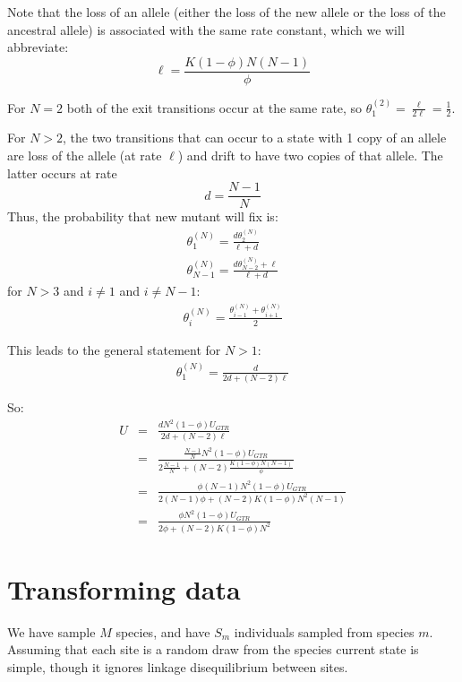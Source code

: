 \documentclass{llncs}
\newcommand{\polyProb}{\ensuremath{\phi}}
\newcommand{\Knorm}{\ensuremath{K}}
\begin{document}
Note that the loss of an allele (either the loss of the new allele or the 
    loss of the ancestral allele) is associated with the same rate constant, which we will
    abbreviate:
    $$\ell = \frac{\Knorm (1-\polyProb)N(N-1)}{\polyProb }$$

For $N=2$ both of the exit transitions occur at the same rate, so $\theta_1^{(2)} = \frac{\ell}{2\ell} = \frac{1}{2}$.

For $N > 2$, the two transitions that can occur to a state with 1 copy of an allele are 
    loss of the allele (at rate $\ell$) and drift to have two copies of that allele.
The latter occurs at rate $$d = \frac{N-1}{N}$$
Thus, the probability that new mutant will fix is:
\begin{eqnarray}
    \theta_1^{(N)} = \frac{d\theta_2^{(N)}}{\ell + d} \\
    \theta_{N-1}^{(N)} = \frac{d\theta_{N-2}^{(N)} + \ell}{\ell + d}
\end{eqnarray}
for $N > 3$ and $i \neq 1$ and $i \neq N-1$:
\begin{eqnarray}
    \theta_{i}^{(N)} = \frac{\theta_{i-1}^{(N)} + \theta_{i+1}^{(N)}}{2}
\end{eqnarray}

This leads to the general statement for $N > 1$:
\begin{eqnarray}
    \theta_1^{(N)} = \frac{d}{2d + (N-2)\ell}
\end{eqnarray}

So:
\begin{eqnarray}
 U & = &  \frac{dN^2(1-\polyProb)U_{GTR}}{2d + (N-2)\ell} \\
  & = &  \frac{\frac{N-1}{N}N^2(1-\polyProb)U_{GTR}}{2\frac{N-1}N
                                                     + (N-2)\frac{\Knorm (1-\polyProb)N(N-1)}{\polyProb }} \\
  & = &  \frac{\polyProb(N-1)N^2(1-\polyProb)U_{GTR}}{2(N-1)\polyProb
                                                     + (N-2)\Knorm (1-\polyProb)N^2(N-1)} \\
  & = &  \frac{\polyProb N^2(1-\polyProb)U_{GTR}}{2\polyProb
                                                     + (N-2)\Knorm (1-\polyProb)N^2}
\end{eqnarray}
\section{Transforming data}
We have sample $M$ species, and have $S_m$ individuals sampled from species $m$.
Assuming that each site is a random draw from the species current state is simple, though it ignores
    linkage disequilibrium between sites.
\end{document}
